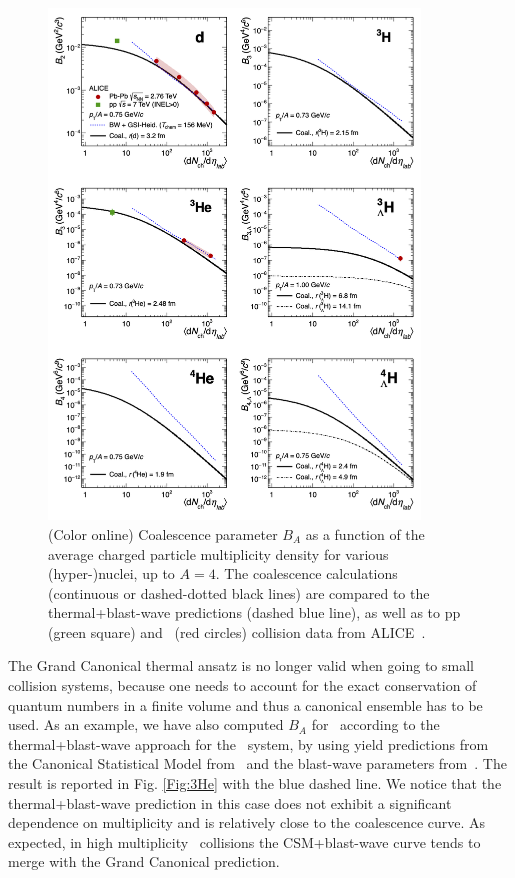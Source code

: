 \documentclass[a4paper,11pt]{article}
\begin{document}
\begin{figure}[!htb]
\begin{center}
\includegraphics[width=0.88\textwidth]{coal2Thermal2alice.png}
\caption{(Color online) Coalescence parameter $B_A$ as a function of the average charged particle multiplicity density for various (hyper-)nuclei, up to $A = 4$. The coalescence calculations (continuous or dashed-dotted black lines) are compared to the thermal+blast-wave predictions (dashed blue line), as well as to pp (green square) and \PbPb~(red circles) collision data from ALICE~\cite{ALICE:nucleipp2017,ALICE:deuteronppPbPb2015,Adam:2015yta}. }
\label{Fig:comparison}
\end{center}
\end{figure} 

The Grand Canonical thermal ansatz is no longer valid when going to small collision systems, because one needs to account for the exact conservation of quantum numbers in a finite volume and thus a canonical ensemble has to be used.
As an example, we have also computed $B_A$ for \hethree~according to the thermal+blast-wave approach for the \pPb~system, by using yield predictions from the Canonical Statistical Model from~\cite{Vovchenko:2018fiy} and the blast-wave parameters from~\cite{Abelev:2013haa}. The result is reported in Fig. \ref{Fig:3He} with the blue dashed line. 
We notice that the thermal+blast-wave prediction in this case does not exhibit a significant dependence on multiplicity and is relatively close to the coalescence curve. As expected, in high multiplicity \pPb~collisions the CSM+blast-wave curve tends to merge with the Grand Canonical prediction. 
\end{document}
